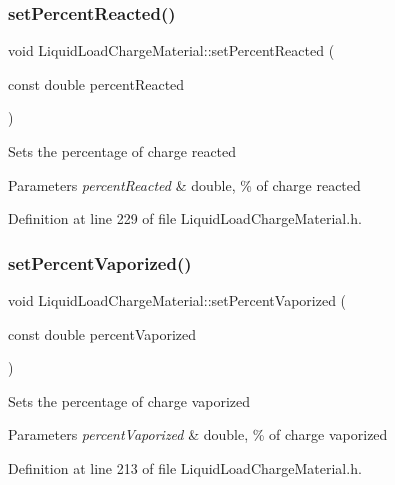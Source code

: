 \subsubsection{\texorpdfstring{set\+Percent\+Reacted()}{setPercentReacted()}}
{\footnotesize\ttfamily void Liquid\+Load\+Charge\+Material\+::set\+Percent\+Reacted (\begin{DoxyParamCaption}\item[{const double}]{percent\+Reacted }\end{DoxyParamCaption})\hspace{0.3cm}{\ttfamily [inline]}}

Sets the percentage of charge reacted 
\begin{DoxyParams}{Parameters}
{\em percent\+Reacted} & double, \% of charge reacted \\
\hline
\end{DoxyParams}


Definition at line 229 of file Liquid\+Load\+Charge\+Material.\+h.

\mbox{\label{class_liquid_load_charge_material_aaf2aa3303201370a7b79e5b3f54e135a}} 
\subsubsection{\texorpdfstring{set\+Percent\+Vaporized()}{setPercentVaporized()}}
{\footnotesize\ttfamily void Liquid\+Load\+Charge\+Material\+::set\+Percent\+Vaporized (\begin{DoxyParamCaption}\item[{const double}]{percent\+Vaporized }\end{DoxyParamCaption})\hspace{0.3cm}{\ttfamily [inline]}}

Sets the percentage of charge vaporized 
\begin{DoxyParams}{Parameters}
{\em percent\+Vaporized} & double, \% of charge vaporized \\
\hline
\end{DoxyParams}


Definition at line 213 of file Liquid\+Load\+Charge\+Material.\+h.

\mbox{\label{class_liquid_load_charge_material_a793c7ebc2643b2af0eaf21b9cb788775}} 
